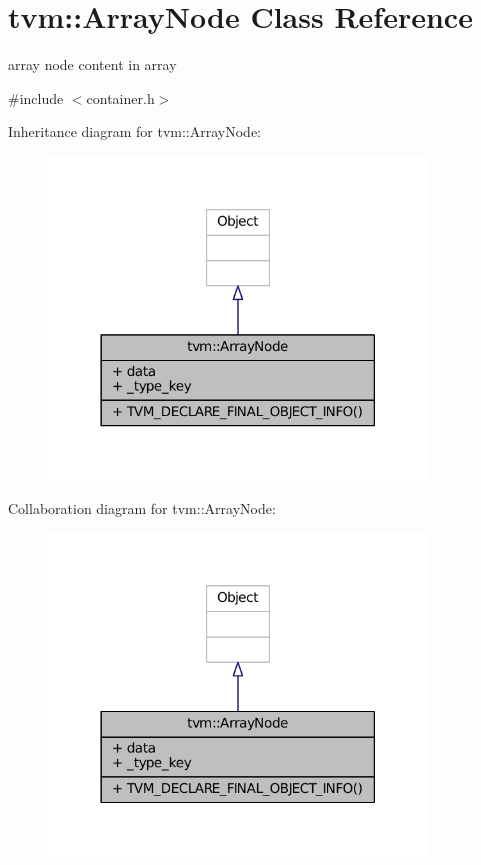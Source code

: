 \hypertarget{classtvm_1_1ArrayNode}{}\section{tvm\+:\+:Array\+Node Class Reference}
\label{classtvm_1_1ArrayNode}


array node content in array  




{\ttfamily \#include $<$container.\+h$>$}



Inheritance diagram for tvm\+:\+:Array\+Node\+:
\nopagebreak
\begin{figure}[H]
\begin{center}
\leavevmode
\includegraphics[width=285pt]{classtvm_1_1ArrayNode__inherit__graph}
\end{center}
\end{figure}


Collaboration diagram for tvm\+:\+:Array\+Node\+:
\nopagebreak
\begin{figure}[H]
\begin{center}
\leavevmode
\includegraphics[width=285pt]{classtvm_1_1ArrayNode__coll__graph}
\end{center}
\end{figure}

